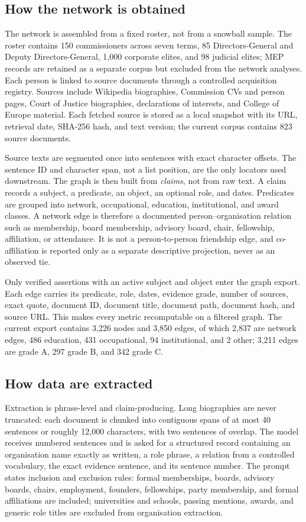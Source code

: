 \documentclass[11pt,a4paper]{article}
\begin{document}
\subsection{How the network is obtained}

The network is assembled from a fixed roster, not from a snowball sample. The roster contains 150 commissioners across seven terms, 85 Directors-General and Deputy Directors-General, 1{,}000 corporate elites, and 98 judicial elites; MEP records are retained as a separate corpus but excluded from the network analyses. Each person is linked to source documents through a controlled acquisition registry. Sources include Wikipedia biographies, Commission CVs and person pages, Court of Justice biographies, declarations of interests, and College of Europe material. Each fetched source is stored as a local snapshot with its URL, retrieval date, SHA-256 hash, and text version; the current corpus contains 823 source documents.

Source texts are segmented once into sentences with exact character offsets. The sentence ID and character span, not a list position, are the only locators used downstream. The graph is then built from \emph{claims}, not from raw text. A claim records a subject, a predicate, an object, an optional role, and dates. Predicates are grouped into network, occupational, education, institutional, and award classes. A network edge is therefore a documented person--organisation relation such as membership, board membership, advisory board, chair, fellowship, affiliation, or attendance. It is not a person-to-person friendship edge, and co-affiliation is reported only as a separate descriptive projection, never as an observed tie.

Only verified assertions with an active subject and object enter the graph export. Each edge carries its predicate, role, dates, evidence grade, number of sources, exact quote, document ID, document title, document path, document hash, and source URL. This makes every metric recomputable on a filtered graph. The current export contains 3{,}226 nodes and 3{,}850 edges, of which 2{,}837 are network edges, 486 education, 431 occupational, 94 institutional, and 2 other; 3{,}211 edges are grade A, 297 grade B, and 342 grade C.

\subsection{How data are extracted}

Extraction is phrase-level and claim-producing. Long biographies are never truncated: each document is chunked into contiguous spans of at most 40 sentences or roughly 12{,}000 characters, with two sentences of overlap. The model receives numbered sentences and is asked for a structured record containing an organisation name exactly as written, a role phrase, a relation from a controlled vocabulary, the exact evidence sentence, and its sentence number. The prompt states inclusion and exclusion rules: formal memberships, boards, advisory boards, chairs, employment, founders, fellowships, party membership, and formal affiliations are included; universities and schools, passing mentions, awards, and generic role titles are excluded from organisation extraction.
\end{document}
